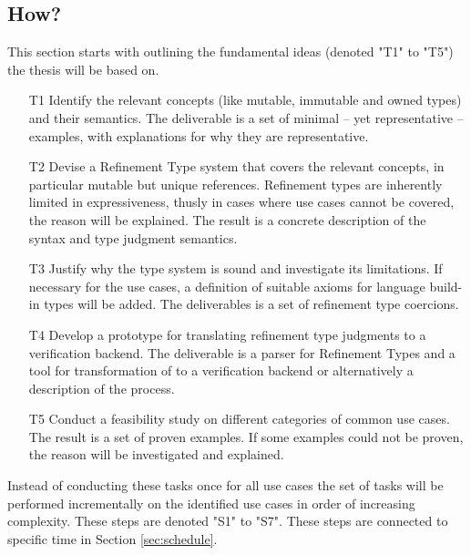 \documentclass[11pt]{article}
\begin{document}
\subsection{How?} \label{ssec:How}

This section starts with outlining the fundamental ideas (denoted "T1" to "T5") the thesis will be based on.

\begin{itemize}
	\item[T1] Identify the relevant concepts (like mutable, immutable and owned types) and their semantics. The deliverable is a set of minimal -- yet representative -- examples, with explanations for why they are representative.
	\item[T2] Devise a Refinement Type system that covers the relevant concepts, in particular mutable but unique references. Refinement types are inherently limited in expressiveness, thusly in cases where use cases cannot be covered, the reason will be explained. The result is a concrete description of the syntax and type judgment semantics.
	\item[T3] Justify why the type system is sound and investigate its limitations. If necessary for the use cases, a definition of suitable axioms for language build-in types will be added. The deliverables is a set of refinement type coercions.
	\item[T4] Develop a prototype for translating refinement type judgments to a verification backend. The deliverable is a parser for Refinement Types and a tool for transformation of to a verification backend or alternatively a description of the process.
	\item[T5] Conduct a feasibility study on different categories of common use cases. The result is a set of proven examples. If some examples could not be proven, the reason will be investigated and explained.
\end{itemize}

Instead of conducting these tasks once for all use cases the set of tasks will be performed incrementally on the identified use cases in order of increasing complexity. These steps are denoted "S1" to "S7". These steps are connected to specific time in Section \ref{sec:schedule}.
\end{document}
